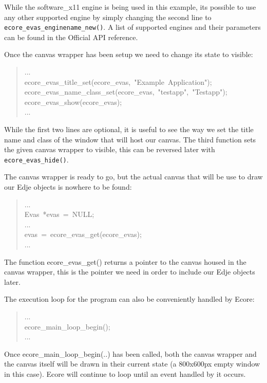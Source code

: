 \documentclass[12pt,a4paper,english]{book}
\begin{document}
While the software{\_}x11 engine is being used in this example, its possible to
use any other supported engine by simply changing the second line to
\texttt{ecore{\_}evas{\_}enginename{\_}new()}. A list of supported engines and their
parameters can be found in the Official API reference.

Once the canvas wrapper has been setup we need to change its state to visible:
\begin{quote}{\ttfamily \raggedright \noindent
...~\\
ecore{\_}evas{\_}title{\_}set(ecore{\_}evas,~"Example~Application");~\\
ecore{\_}evas{\_}name{\_}class{\_}set(ecore{\_}evas,~"testapp",~"Testapp");~\\
ecore{\_}evas{\_}show(ecore{\_}evas);~\\
...
}\end{quote}

While the first two lines are optional, it is useful to see the way we set the
title name and class of the window that will host our canvas. The third
function sets the given canvas wrapper to visible, this can be reversed later
with \texttt{ecore{\_}evas{\_}hide()}.

The canvas wrapper is ready to go, but the actual canvas that will be use to
draw our Edje objects is nowhere to be found:
\begin{quote}{\ttfamily \raggedright \noindent
...~\\
Evas~*evas~=~NULL;~\\
...~\\
evas~=~ecore{\_}evas{\_}get(ecore{\_}evas);~\\
...
}\end{quote}

The function ecore{\_}evas{\_}get() returns a pointer to the canvas housed in the
canvas wrapper, this is the pointer we need in order to include our Edje
objects later.

The execution loop for the program can also be conveniently handled by Ecore:
\begin{quote}{\ttfamily \raggedright \noindent
...~\\
ecore{\_}main{\_}loop{\_}begin();~\\
...
}\end{quote}

Once ecore{\_}main{\_}loop{\_}begin(..) has been called, both the canvas wrapper and
the canvas itself will be drawn in their current state (a 800x600px empty
window in this case). Ecore will continue to loop until an event handled by it
occurs.
\end{document}
